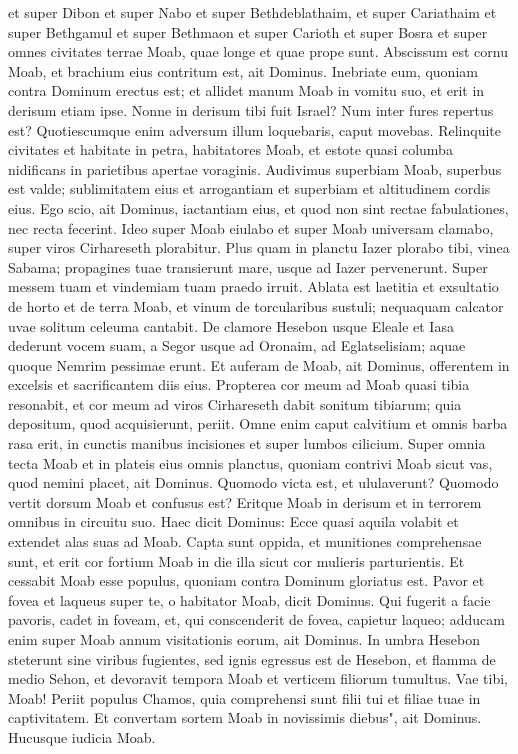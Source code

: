 \begin{biblechapter}
\verse et super Dibon et super Nabo et super Bethdeblathaim, 
\verse et super Cariathaim et super Bethgamul et super Bethmaon 
\verse et super Carioth et super Bosra et super omnes civitates terrae Moab, quae longe et quae prope sunt. 
\verse Abscissum est cornu Moab, et brachium eius contritum est, ait Dominus. 
\verse Inebriate eum, quoniam contra Dominum erectus est; et allidet manum Moab in vomitu suo, et erit in derisum etiam ipse. 
\verse Nonne in derisum tibi fuit Israel? Num inter fures repertus est? Quotiescumque enim adversum illum loquebaris, caput movebas. 
\verse Relinquite civitates et habitate in petra, habitatores Moab, et estote quasi columba nidificans in parietibus apertae voraginis. 
\verse Audivimus superbiam Moab, superbus est valde; sublimitatem eius et arrogantiam et superbiam et altitudinem cordis eius. 
\verse Ego scio, ait Dominus, iactantiam eius, et quod non sint rectae fabulationes, nec recta fecerint. 
\verse Ideo super Moab eiulabo et super Moab universam clamabo, super viros Cirhareseth plorabitur. 
\verse Plus quam in planctu Iazer plorabo tibi, vinea Sabama; propagines tuae transierunt mare, usque ad Iazer pervenerunt. Super messem tuam et vindemiam tuam praedo irruit. 
\verse Ablata est laetitia et exsultatio de horto et de terra Moab, et vinum de torcularibus sustuli; nequaquam calcator uvae solitum celeuma cantabit. 
\verse De clamore Hesebon usque Eleale et Iasa dederunt vocem suam, a Segor usque ad Oronaim, ad Eglatselisiam; aquae quoque Nemrim pessimae erunt. 
\verse Et auferam de Moab, ait Dominus, offerentem in excelsis et sacrificantem diis eius. 
\verse Propterea cor meum ad Moab quasi tibia resonabit, et cor meum ad viros Cirhareseth dabit sonitum tibiarum; quia depositum, quod acquisierunt, periit. 
\verse Omne enim caput calvitium et omnis barba rasa erit, in cunctis manibus incisiones et super lumbos cilicium. 
\verse Super omnia tecta Moab et in plateis eius omnis planctus, quoniam contrivi Moab sicut vas, quod nemini placet, ait Dominus. 
\verse Quomodo victa est, et ululaverunt? Quomodo vertit dorsum Moab et confusus est? Eritque Moab in derisum et in terrorem omnibus in circuitu suo. 
\verse Haec dicit Dominus: Ecce quasi aquila volabit et extendet alas suas ad Moab. 
\verse Capta sunt oppida, et munitiones comprehensae sunt, et erit cor fortium Moab in die illa sicut cor mulieris parturientis. 
\verse Et cessabit Moab esse populus, quoniam contra Dominum gloriatus est. 
\verse Pavor et fovea et laqueus super te, o habitator Moab, dicit Dominus. 
\verse Qui fugerit a facie pavoris, cadet in foveam, et, qui conscenderit de fovea, capietur laqueo; adducam enim super Moab annum visitationis eorum, ait Dominus. 
\verse In umbra Hesebon steterunt sine viribus fugientes, sed ignis egressus est de Hesebon, et flamma de medio Sehon, et devoravit tempora Moab et verticem filiorum tumultus. 
\verse Vae tibi, Moab! Periit populus Chamos, quia comprehensi sunt filii tui et filiae tuae in captivitatem. 
\verse Et convertam sortem Moab in novissimis diebus", ait Dominus. Hucusque iudicia Moab. 
\end{biblechapter}

